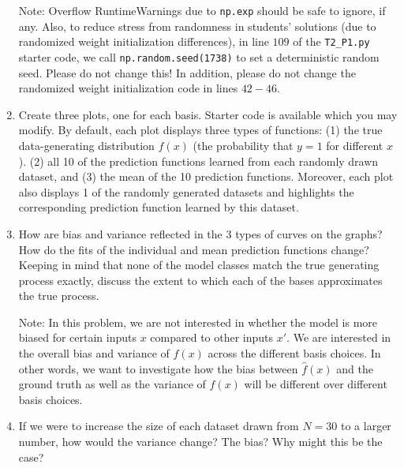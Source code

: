 \documentclass[submit]{harvardml}
\begin{document}
\begin{problem}
\begin{enumerate}
   Note: Overflow RuntimeWarnings due to \verb|np.exp| should be safe to ignore, if any. Also, to reduce stress from randomness in students' solutions (due to randomized weight initialization differences), in line $109$ of the \verb|T2_P1.py| starter code, we call \verb|np.random.seed(1738)| to set a deterministic random seed. Please do not change this! In addition, please do not change the randomized weight initialization code in lines $42-46$.

\item Create three plots, one for each basis. Starter code is available which you may modify.
By default, each plot displays three types of functions:
(1) the true data-generating distribution $f(x)$ (the probability that $y=1$ for different $x$).
(2) all 10 of the prediction functions learned from each randomly drawn dataset, and
(3) the mean of the 10 prediction functions.
Moreover, each plot also displays 1 of the randomly generated datasets and highlights the corresponding prediction function learned by this dataset.

\item How are bias and variance reflected in the 3 types of curves on
  the graphs?  How do the fits of the individual and mean prediction
  functions change?  Keeping in mind that none of the model classes
  match the true generating process exactly, discuss the extent to
  which each of the bases approximates the true process.

  Note: In this problem, we are not interested in whether the model is
  more biased for certain inputs $x$ compared to other inputs $x'$.
  We are interested in the overall bias and variance of $\hat{f}(x)$
  across the different basis choices. In other words, we want to investigate how the bias between $\hat{f}(x)$ and the ground truth as well as the variance of $\hat{f}(x)$ will be different over different basis choices. 

\item If we were to increase the size of each dataset drawn from $N = 30$ to a larger number, how would the variance change? The bias?   Why might this be the case?

\end{enumerate}

\end{problem}

\newpage
\end{document}
